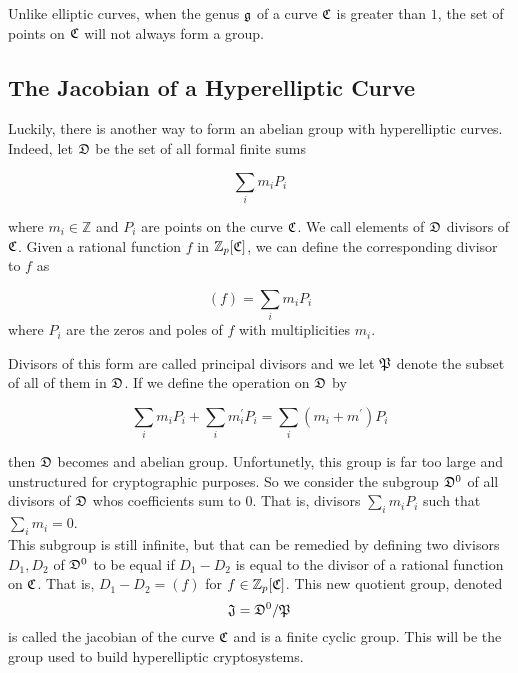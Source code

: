 Unlike elliptic curves, when the genus $\mathfrak{g}$ of a curve $\mathfrak{C} $ is greater than $1$, the set of points on $\mathfrak{C}$ will not always form a group. 

\begin{example}

\end{example}

\subsection{The Jacobian of a Hyperelliptic Curve}

Luckily, there is another way to form an abelian group with hyperelliptic curves. Indeed, let $\mathfrak{D}$ be the set of all formal finite sums 

$$ \sum_i m_i P_i $$ 

where $m_i \in \mathbb{Z}$ and $P_i$ are points on the curve $\mathfrak{C}$. We call elements of $\mathfrak{D}$ divisors of $\mathfrak{C}$. Given a rational function $f$ in $\mathbb{Z}_p[\mathfrak{C}]$, we can define the corresponding divisor to $f$ as

$$(f) = \sum_i m_i P_i $$ where $P_i$ are the zeros and poles of $f$ with multiplicities $m_i$. 

\begin{example}
\end{example} 

Divisors of this form are called principal divisors and we let $\mathfrak{P}$ denote the subset of all of them in $\mathfrak{D}$. If we define the operation on $\mathfrak{D}$ by 

$$ \sum_i m_i P_i  + \sum_i m^\prime_i P_i  = \sum_i (m_i+m^\prime) P_i $$ 

then $\mathfrak{D}$ becomes and abelian group. Unfortunetly, this group is far too large and unstructured for cryptographic purposes. So we consider the subgroup $\mathfrak{D}^0$ of all divisors of $\mathfrak{D}$ whos coefficients sum to $0$. That is, divisors $ \sum_i m_i P_i $ such that $\sum_i m_i = 0$. \\ 

This subgroup is still infinite, but that can be remedied by defining two divisors $D_1, D_2$ of $\mathfrak{D}^0$ to be equal if $D_1 - D_2$ is equal to the divisor of a rational function on $\mathfrak{C}$. That is, $D_1 - D_2 = (f) $ for $f \in \mathbb{Z}_p[\mathfrak{C}]$. This new quotient group, denoted $$\mathfrak{J} = \mathfrak{D}^0 / \mathfrak{P}$$ is called the jacobian of the curve $\mathfrak{C}$ and is a finite cyclic group. This will be the group used to build hyperelliptic cryptosystems.

